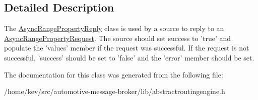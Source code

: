 \subsection{Detailed Description}
The \hyperlink{classAsyncRangePropertyReply}{Async\+Range\+Property\+Reply} class is used by a source to reply to an \hyperlink{classAsyncRangePropertyRequest}{Async\+Range\+Property\+Request}. The source should set success to 'true' and populate the 'values' member if the request was successful. If the request is not successful, 'success' should be set to 'false' and the 'error' member should be set. 

The documentation for this class was generated from the following file\+:\begin{DoxyCompactItemize}
\item 
/home/kev/src/automotive-\/message-\/broker/lib/abstractroutingengine.\+h\end{DoxyCompactItemize}
